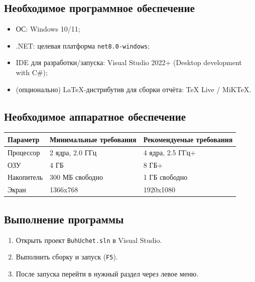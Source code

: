 \documentclass[14pt,a4paper]{extarticle}
\begin{document}
\subsection{Необходимое программное обеспечение}
\begin{itemize}
    \item ОС: Windows 10/11;
    \item .NET: целевая платформа \texttt{net8.0-windows};
    \item IDE для разработки/запуска: Visual Studio 2022+ (Desktop development with C\#);
    \item (опционально) LaTeX-дистрибутив для сборки отчёта: TeX Live / MiKTeX.
\end{itemize}

\subsection{Необходимое аппаратное обеспечение}
\begin{longtable}{|p{5.2cm}|p{4.8cm}|p{4.8cm}|}
\hline
\textbf{Параметр} & \textbf{Минимальные требования} & \textbf{Рекомендуемые требования} \\
\hline
Процессор & 2 ядра, 2.0 ГГц & 4 ядра, 2.5 ГГц+ \\
\hline
ОЗУ & 4 ГБ & 8 ГБ+ \\
\hline
Накопитель & 300 МБ свободно & 1 ГБ свободно \\
\hline
Экран & 1366x768 & 1920x1080 \\
\hline
\end{longtable}

\subsection{Выполнение программы}
\begin{enumerate}
    \item Открыть проект \texttt{BuhUchet.sln} в Visual Studio.
    \item Выполнить сборку и запуск (\texttt{F5}).
    \item После запуска перейти в нужный раздел через левое меню.
\end{enumerate}
\end{document}
